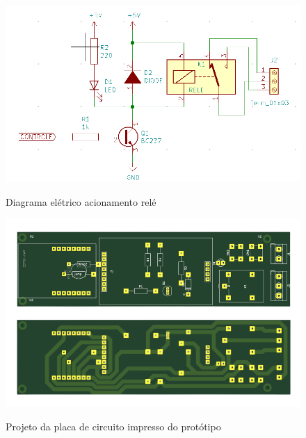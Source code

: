\begin{figure}[h!]
    \centering
    \caption{Diagrama elétrico acionamento relé}
    \includegraphics[scale=0.4]{figuras/modulo_rele_esquema.png}
    \fonte{}%
    \label{fig:diagramarele}
    \centering
\end{figure}


\begin{figure}[h!]
    \centering
    \caption{Projeto da placa de circuito impresso do protótipo}
    \includegraphics[scale=0.35]{figuras/placa_pcb.png}
    \fonte{}%
    \label{fig:placapcb}
    \centering
\end{figure}

